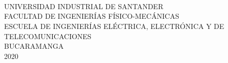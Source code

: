 \noindent \begin{center}
\textbf{\large ~}
\par\end{center}{\large \par}


\noindent \begin{center}
\textbf{\large ~}
\par\end{center}{\large \par}

\noindent \begin{center}
\textbf{\large ~}
\par\end{center}{\large \par}

\noindent \begin{center}%
{\large UNIVERSIDAD INDUSTRIAL DE SANTANDER
}\\
{\large FACULTAD DE INGENIERÍAS FÍSICO-MECÁNICAS}\\ %
{\large ESCUELA DE INGENIERÍAS ELÉCTRICA, ELECTRÓNICA Y DE TELECOMUNICACIONES}\\ %
{\large BUCARAMANGA}\\%
{\large 2020}%
\par\end{center}{\large \par}

\thispagestyle{empty} %
